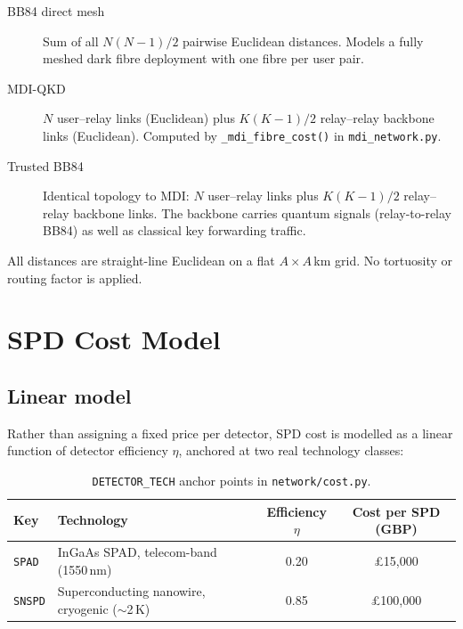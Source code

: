 \documentclass[12pt,a4paper]{article}
\begin{document}
\begin{description}
  \item[BB84 direct mesh] Sum of all $N(N{-}1)/2$ pairwise Euclidean distances.
        Models a fully meshed dark fibre deployment with one fibre per user pair.
  \item[MDI-QKD] $N$ user--relay links (Euclidean) plus $K(K{-}1)/2$
        relay--relay backbone links (Euclidean). Computed by
        \texttt{\_mdi\_fibre\_cost()} in \texttt{mdi\_network.py}.
  \item[Trusted BB84] Identical topology to MDI: $N$ user--relay links plus
        $K(K{-}1)/2$ relay--relay backbone links. The backbone carries
        quantum signals (relay-to-relay BB84) as well as classical key
        forwarding traffic.
\end{description}

All distances are straight-line Euclidean on a flat $A \times A$\,km grid.
No tortuosity or routing factor is applied.

\section{SPD Cost Model}

\subsection{Linear model}

Rather than assigning a fixed price per detector, SPD cost is modelled as a
linear function of detector efficiency $\eta$, anchored at two real technology
classes:

\begin{table}[h!]
\centering
\begin{tabular}{llcc}
\toprule
Key & Technology & Efficiency $\eta$ & Cost per SPD (GBP) \\
\midrule
\texttt{SPAD}  & InGaAs SPAD, telecom-band (1550\,nm) & 0.20 & \pounds15{,}000 \\
\texttt{SNSPD} & Superconducting nanowire, cryogenic ($\sim$2\,K) & 0.85 & \pounds100{,}000 \\
\bottomrule
\end{tabular}
\caption{\texttt{DETECTOR\_TECH} anchor points in \texttt{network/cost.py}.}
\end{table}
\end{document}
